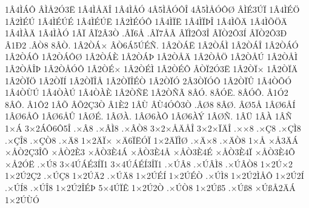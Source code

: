 {1^^c24^^cc^^c1^^d4
^^c2^^cc^^c52^^d33^^cb
1^^c24^^cc^^c5^^c4^^ce
1^^c24^^cc^^c5^^d3
4^^c25^^cc^^c5^^d3^^d4^^ce
4^^c25^^cc^^c5^^d3^^d4^^d8
^^c2^^cc^^c93^^da^^cf
1^^c24^^cc^^c9^^d6
1^^c22^^cc^^c9^^da
1^^c24^^cc^^c9^^da^^c9
1^^c24^^cc^^c9^^da^^cb
1^^c22^^cc^^c9^^d3^^d4
1^^c24^^cc^^cf^^cb
1^^c24^^cc^^cf^^de^^ce
1^^c24^^cc^^d5^^c4
1^^c24^^cc^^d5^^d6^^c4
1^^c24^^cc^^c0^^c4
1^^c24^^cc^^c0^^d3
1^^c2^^cf
^^c2^^cf2^^c23^^d2
.^^c2^^cf6^^c5
.^^c2^^cf7^^c5^^c3
^^c2^^cf^^cc2^^d43^^ce
^^c2^^cf^^d22^^d43^^cd
^^c2^^cf^^d22^^d43^^d0
^^c21^^d02
.^^c2^^d28
8^^c2^^d2.
1^^c22^^d2^^c1^^d7
^^c2^^d26^^c15^^da^^c9^^d1.
1^^c22^^d2^^c1^^cb
1^^c22^^d2^^c1^^cc
1^^c22^^d2^^c1^^ce
1^^c22^^d2^^c1^^d3
1^^c22^^d2^^c1^^d4
1^^c22^^d2^^c1^^d4^^d8
1^^c22^^d2^^c1^^c8
1^^c22^^d2^^c1^^de
1^^c22^^d2^^c5^^c4
1^^c22^^d2^^c5^^d6
1^^c22^^d2^^c5^^da
1^^c22^^d2^^c5^^cc
1^^c22^^d2^^c5^^ce^^de
1^^c22^^d2^^c5^^d3^^d4
1^^c22^^d2^^c9^^d7
1^^c22^^d2^^c9^^cc
1^^c22^^d2^^c9^^d4
^^c2^^d2^^cf2^^d33^^cb
1^^c22^^d2^^cf^^d7
1^^c22^^d2^^cf^^c4
1^^c22^^d2^^cf^^d6
1^^c22^^d2^^cf^^cd
1^^c22^^d2^^cf^^ce^^c5
1^^c22^^d2^^cf^^ce^^c9^^d2
1^^c22^^d2^^cf^^d3
2^^c23^^d2^^cf^^d3^^d4
1^^c22^^d2^^cf^^db
1^^c24^^d2^^d5^^d3
1^^c24^^d2^^d9^^da
1^^c24^^d2^^c0^^da
1^^c24^^d2^^c0^^c8
1^^c22^^d2^^d1^^cb
1^^c22^^d2^^d1^^c3
8^^c2^^d3.
8^^c2^^d3^^cb.
8^^c2^^d3^^d4.
^^c21^^d32
8^^c2^^d4.
^^c21^^d42
1^^c2^^d5
^^c2^^d52^^c73^^d2
^^c21^^c82
1^^c2^^d9
^^c2^^d94^^d3^^d43^^d2
.^^c2^^d88
8^^c2^^d8.
^^c2^^d85^^c5
1^^c2^^d86^^c5^^cd
1^^c2^^d86^^c5^^d4
1^^c2^^d86^^c5^^db
1^^c2^^d8^^c9.
1^^c2^^d8^^c0.
1^^c2^^d86^^c0^^d4
1^^c2^^d86^^c0^^dd
1^^c2^^d8^^d1.
1^^c2^^dc
1^^c2^^c0
1^^c2^^d1
1^^d7^^c1
3^^d72^^c1^^d46^^d45^^ce
.^^d7^^c28
.^^d7^^c2^^cc8
.^^d7^^c2^^d28
3^^d72^^d7^^c5^^c4^^c5^^ce
3^^d72^^d7^^cf^^c4^^ce
.^^d7^^d78
.^^d7^^c78
.^^d7^^c7^^cc8
.^^d7^^c7^^ce8
.^^d7^^c7^^d28
.^^d7^^c48
1^^d72^^c4^^cf^^d7
^^d7^^c46^^cf^^cb^^d3^^cf
1^^d72^^c4^^cf^^cc^^d8
.^^d7^^c4^^d78
.^^d7^^c4^^d28
1^^d7^^c5
^^d7^^c53^^c4^^c1
^^d7^^c5^^d22^^c73^^ce^^d5
^^d7^^c5^^d22^^c83
^^d7^^c5^^d23^^c84^^c1
^^d7^^c5^^d23^^c84^^c5
^^d7^^c5^^d23^^c84^^c9
^^d7^^c5^^d23^^c84^^cf
^^d7^^c5^^d23^^c84^^d5
^^d7^^c52^^d3^^cb
.^^d7^^da8
3^^d74^^da^^c1^^c93^^cd^^cf1
3^^d74^^da^^c1^^c9^^cd3^^ce^^cf1
.^^d7^^da^^c28
.^^d7^^da^^c2^^cc8
.^^d7^^da^^c2^^d28
1^^d72^^da^^d72
1^^d72^^da2^^c72
.^^d7^^da^^c78
1^^d72^^da^^c42
.^^d7^^da^^c48
1^^d72^^da^^c9^^cd
1^^d72^^da^^c9^^d2
.^^d7^^da^^cc8
1^^d72^^da2^^cc^^c5^^d4
1^^d72^^da2^^cd
.^^d7^^da^^cd8
.^^d7^^da^^ce8
1^^d72^^da2^^ce^^c9^^de
5^^d74^^da^^cf^^ca
1^^d72^^da2^^d2
.^^d7^^da^^d28
1^^d72^^da^^df5
.^^d7^^da^^df8
^^d7^^da^^df^^c52^^c4^^c1
1^^d72^^da^^d9^^d3
}
